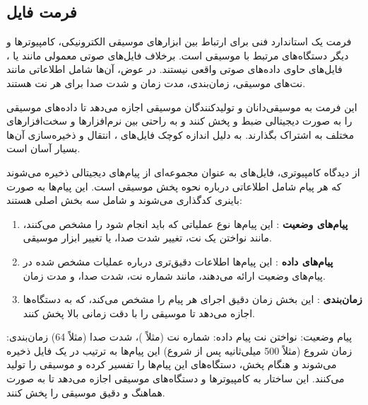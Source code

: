 \subsection{فرمت فایل }

فرمت   \cite{de2017understanding} یک استاندارد فنی برای ارتباط بین ابزارهای موسیقی الکترونیکی، کامپیوترها و دیگر دستگاه‌های مرتبط با موسیقی است. برخلاف فایل‌های صوتی معمولی مانند  یا ، فایل‌های  حاوی داده‌های صوتی واقعی نیستند. در عوض، آن‌ها شامل اطلاعاتی مانند نت‌های موسیقی، زمان‌بندی، مدت زمان و شدت صدا برای هر نت هستند.

این فرمت به موسیقی‌دانان و تولیدکنندگان موسیقی اجازه می‌دهد تا داده‌های موسیقی را به صورت دیجیتالی ضبط و پخش کنند و به راحتی بین نرم‌افزارها و سخت‌افزارهای مختلف به اشتراک بگذارند. به دلیل اندازه کوچک فایل‌های ، انتقال و ذخیره‌سازی آن‌ها بسیار آسان است.

از دیدگاه کامپیوتری، فایل‌های  به عنوان مجموعه‌ای از پیام‌های دیجیتالی ذخیره می‌شوند که هر پیام شامل اطلاعاتی درباره نحوه پخش موسیقی است. این پیام‌ها به صورت باینری کدگذاری می‌شوند و شامل سه بخش اصلی هستند:

\begin{enumerate}
      \def\labelenumi{\arabic{enumi}.}
      \item
            \textbf{پیام‌های وضعیت }: این پیام‌ها نوع عملیاتی که
            باید انجام شود را مشخص می‌کنند، مانند نواختن یک نت، تغییر شدت صدا، یا
            تغییر ابزار موسیقی.
      \item
            \textbf{پیام‌های داده }: این پیام‌ها اطلاعات دقیق‌تری
            درباره عملیات مشخص شده در پیام‌های وضعیت ارائه می‌دهند، مانند شماره نت،
            شدت صدا، و مدت زمان.
      \item
            \textbf{زمان‌بندی }: این بخش زمان دقیق اجرای هر پیام را مشخص
            می‌کند، که به دستگاه‌ها اجازه می‌دهد تا موسیقی را با دقت زمانی بالا پخش
            کنند.
\end{enumerate}

پیام وضعیت: نواختن نت 
پیام داده: شماره نت (مثلاً )، شدت صدا (مثلاً 64)
زمان‌بندی: زمان شروع (مثلاً 500 میلی‌ثانیه پس از شروع)
این پیام‌ها به ترتیب در یک فایل  ذخیره می‌شوند و هنگام پخش، دستگاه‌های  این پیام‌ها را تفسیر کرده و موسیقی را تولید می‌کنند. این ساختار به کامپیوترها و دستگاه‌های موسیقی اجازه می‌دهد تا به صورت هماهنگ و دقیق موسیقی را پخش کنند.

